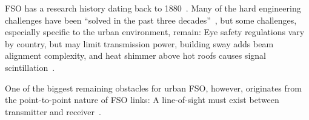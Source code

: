 FSO has a research history dating back to 1880~\cite{fsosurveydefault}.
Many of the hard engineering challenges have been ``solved in the past three decades''~\cite{invited}, but some challenges, especially specific to the urban environment, remain: Eye safety regulations vary by country, but may limit transmission power, building sway adds beam alignment complexity, and heat shimmer above hot roofs causes signal scintillation~\cite{urbanfsosurvey, fsobackhaul}.

One of the biggest remaining obstacles for urban FSO, however, originates from the point-to-point nature of FSO links: A line-of-sight must exist between transmitter and receiver~\cite{systematicsurvey}.

%
%
%
%
%
%
%
